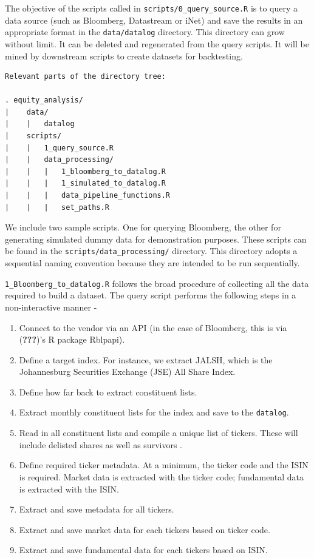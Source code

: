 \documentclass[11pt,preprint, authoryear]{elsarticle}
\numberwithin{equation}{section}
\numberwithin{figure}{section}
\numberwithin{table}{section}
\def\tightlist{} %
\begin{document}
The objective of the scripts called in
\texttt{scripts/0\_query\_source.R} is to query a data source (such as
Bloomberg, Datastream or iNet) and save the results in an appropriate
format in the \texttt{data/datalog} directory. This directory can grow
without limit. It can be deleted and regenerated from the query scripts.
It will be mined by downstream scripts to create datasets for
backtesting.

\begin{verbatim}
Relevant parts of the directory tree: 

. equity_analysis/
|    data/
|    |   datalog
|    scripts/
|    |   1_query_source.R
|    |   data_processing/
|    |   |   1_bloomberg_to_datalog.R
|    |   |   1_simulated_to_datalog.R
|    |   |   data_pipeline_functions.R
|    |   |   set_paths.R
\end{verbatim}

We include two sample scripts. One for querying Bloomberg, the other for
generating simulated dummy data for demonstration purposes. These
scripts can be found in the \texttt{scripts/data\_processing/}
directory. This directory adopts a sequential naming convention because
they are intended to be run sequentially.

\texttt{1\_Bloomberg\_to\_datalog.R} follows the broad procedure of
collecting all the data required to build a dataset. The query script
performs the following steps in a non-interactive manner -

\begin{enumerate}
\def\labelenumi{\arabic{enumi}.}
\tightlist
\item
  Connect to the vendor via an API (in the case of Bloomberg, this is
  via ({\textbf{???}})'s R package Rblpapi).
\item
  Define a target index. For instance, we extract JALSH, which is the
  Johannesburg Securities Exchange (JSE) All Share Index.
\item
  Define how far back to extract constituent lists.
\item
  Extract monthly constituent lists for the index and save to the
  \texttt{datalog}.
\item
  Read in all constituent lists and compile a unique list of tickers.
  These will include delisted shares as well as survivors .
\item
  Define required ticker metadata. At a minimum, the ticker code and the
  ISIN is required. Market data is extracted with the ticker code;
  fundamental data is extracted with the ISIN.
\item
  Extract and save metadata for all tickers.
\item
  Extract and save market data for each tickers based on ticker code.
\item
  Extract and save fundamental data for each tickers based on ISIN.
\end{enumerate}
\end{document}
